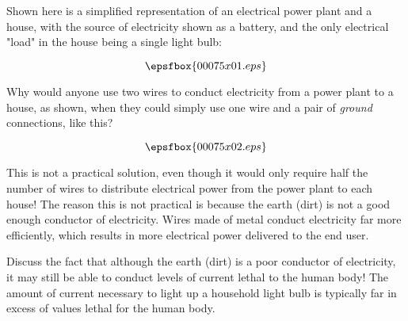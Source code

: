 

Shown here is a simplified representation of an electrical power plant and a house, with the source of electricity shown as a battery, and the only electrical "load" in the house being a single light bulb:

$$\epsfbox{00075x01.eps}$$

Why would anyone use two wires to conduct electricity from a power plant to a house, as shown, when they could simply use one wire and a pair of {\it ground} connections, like this?
 
$$\epsfbox{00075x02.eps}$$







This is not a practical solution, even though it would only require half the number of wires to distribute electrical power from the power plant to each house!  The reason this is not practical is because the earth (dirt) is not a good enough conductor of electricity.  Wires made of metal conduct electricity far more efficiently, which results in more electrical power delivered to the end user.







Discuss the fact that although the earth (dirt) is a poor conductor of electricity, it may still be able to conduct levels of current lethal to the human body!  The amount of current necessary to light up a household light bulb is typically far in excess of values lethal for the human body.




